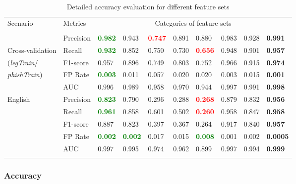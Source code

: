 \documentclass[10pt,conference,compsocconf,letterpaper]{IEEEtran}
\begin{document}
\iffeateval
\begin{table*}[th]
\caption{Detailed accuracy evaluation for different feature sets} \centering
	\begin{tabular}{ p{2.3cm} p{2.2cm}  p{1.1cm}  p{1.1cm}  p{1.1cm} p{1.1cm}   p{1.1cm}   p{1.1cm}   p{1.1cm}   p{1.1cm}   }
	Scenario	& Metrics & \multicolumn{8}{c}{Categories of feature sets} \\
 &  &    &  &   &  &  &   &  &\textbf{}  \\
		\hline
 &	Precision & \textbf{\textcolor{green}{0.982}} & 0.943 &  \textbf{\textcolor{red}{0.747}} &  0.891 &  0.880 &  0.983 &  0.928 &\textbf{0.991} 	 \\
Cross-validation & Recall & \textbf{\textcolor{green}{0.932}} & 0.852 & 0.750 & 0.730 & \textbf{\textcolor{red}{0.656}} & 0.948 & 0.901 &\textbf{0.957} 	 \\
(\textit{legTrain}/& F1-score & 0.957 & 0.896 & 0.749 & 0.803 & 0.752 & 0.966 & 0.915 & \textbf{0.974}	 \\
\textit{phishTrain})& FP Rate & \textbf{\textcolor{green}{0.003}} & 0.011 & 0.057 & 0.020 & 0.020 & 0.003 & 0.015 & \textbf{0.001}	 \\ 
& AUC & 0.996 & 0.989 & 0.958 & 0.970 & 0.944 & 0.997 & 0.991 & \textbf{0.998}	 \\ \hline
	\multirow{5}{*}{English} &Precision & \textbf{\textcolor{green}{0.823}} & 0.790 & 0.296 & 0.288 & \textbf{\textcolor{red}{0.268}} & 0.879 & 0.832 &\textbf{0.956} 	 \\
& Recall &\textbf{\textcolor{green}{0.961}} & 0.858 & 0.601 & 0.502 & \textbf{\textcolor{red}{0.260}} & 0.958 & 0.847 & \textbf{0.958}	 \\
& F1-score & 0.887 & 0.823 & 0.397 & 0.367 & 0.264 & 0.917 & 0.840 & \textbf{0.957}	 \\
& FP Rate &  \textbf{\textcolor{green}{0.002}} &  \textbf{\textcolor{green}{0.002}} & 0.017 & 0.015 & \textbf{\textcolor{green}{0.008}} & 0.001 & 0.002 & \textbf{0.0005} \\ 
& AUC & 0.997 & 0.995 & 0.974 & 0.962 & 0.899 & 0.997 & 0.994 & \textbf{0.999}	 \\ 
		\label{main-eval-table}
 \end{tabular}
\end{table*}
\fi

\iffeateval
\subsubsection{Accuracy}
\end{document}
